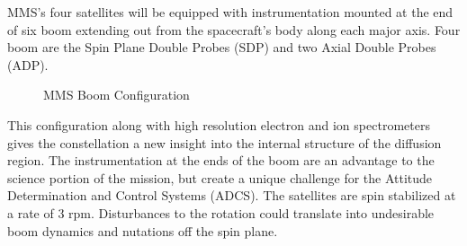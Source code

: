 MMS's four satellites will be equipped with instrumentation mounted at the end of six boom extending out from the spacecraft's body along each major axis.  Four boom are the Spin Plane Double Probes (SDP) and two Axial Double Probes (ADP).

\begin{figure}[H]
\centerline{}
\caption{MMS Boom Configuration}
\label{fig:booms}
\end{figure}

This configuration along with high resolution electron and ion spectrometers gives the constellation a new insight into the internal structure of the diffusion region.  The instrumentation at the ends of the boom are an advantage to the science portion of the mission, but create a unique challenge for the Attitude Determination and Control Systems (ADCS).  The satellites are spin stabilized at a rate of 3 rpm.  Disturbances to the rotation could translate into undesirable boom dynamics and nutations off the spin plane.







